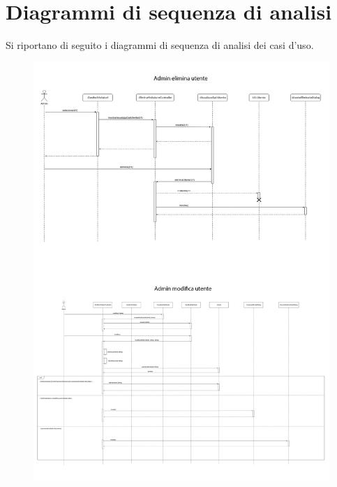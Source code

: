 \section{Diagrammi di sequenza di analisi}
Si riportano di seguito i diagrammi di sequenza di analisi dei casi d'uso.
\begin{figure}[h!]
    \includegraphics[width=\textwidth]{SequenceAnalisi/1.png}
\end{figure}
